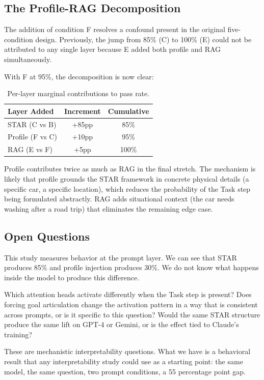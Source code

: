 \documentclass[11pt]{article}
\begin{document}
\subsection{The Profile-RAG Decomposition}

The addition of condition F resolves a confound present in the original five-condition design. Previously, the jump from 85\% (C) to 100\% (E) could not be attributed to any single layer because E added both profile and RAG simultaneously.

With F at 95\%, the decomposition is now clear:

\begin{table}[H]
\centering
\begin{tabular}{lcc}
\toprule
\textbf{Layer Added} & \textbf{Increment} & \textbf{Cumulative} \\
\midrule
STAR (C vs B) & +85pp & 85\% \\
Profile (F vs C) & +10pp & 95\% \\
RAG (E vs F) & +5pp & 100\% \\
\bottomrule
\end{tabular}
\caption{Per-layer marginal contributions to pass rate.}
\label{tab:decomposition}
\end{table}

Profile contributes twice as much as RAG in the final stretch. The mechanism is likely that profile grounds the STAR framework in concrete physical details (a specific car, a specific location), which reduces the probability of the Task step being formulated abstractly. RAG adds situational context (the car needs washing after a road trip) that eliminates the remaining edge case.

\subsection{Open Questions}

This study measures behavior at the prompt layer. We can see that STAR produces 85\% and profile injection produces 30\%. We do not know what happens inside the model to produce this difference.

Which attention heads activate differently when the Task step is present? Does forcing goal articulation change the activation pattern in a way that is consistent across prompts, or is it specific to this question? Would the same STAR structure produce the same lift on GPT-4 or Gemini, or is the effect tied to Claude's training?

These are mechanistic interpretability questions. What we have is a behavioral result that any interpretability study could use as a starting point: the same model, the same question, two prompt conditions, a 55 percentage point gap.
\end{document}
